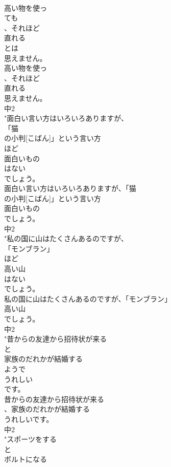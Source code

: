 \documentclass[8pt]{extreport}
\begin{document}
\begin{CJK}{UTF8}{min}
\\	高い物を使っ
\\	ても
\\	、それほど
\\	直れる
\\	とは
\\	思えません。
\\	高い物を使っ
\\	、それほど
\\	直れる
\\	思えません。
\\	中2
\\	"面白い言い方はいろいろありますが、
\\	「猫
\\	の小判[こばん]」という言い方
\\	ほど
\\	面白いもの
\\	はない
\\	でしょう。
\\	面白い言い方はいろいろありますが、「猫
\\	の小判[こばん]」という言い方
\\	面白いもの
\\	でしょう。
\\	中2
\\	"私の国に山はたくさんあるのですが、
\\	「モンブラン」
\\	ほど
\\	高い山
\\	はない
\\	でしょう。
\\	私の国に山はたくさんあるのですが、「モンブラン」
\\	高い山
\\	でしょう。
\\	中2
\\	"昔からの友達から招待状が来る
\\	と
\\	家族のだれかが結婚する
\\	ようで
\\	うれしい
\\	です。
\\	昔からの友達から招待状が来る
\\	、家族のだれかが結婚する
\\	うれしいです。
\\	中2
\\	"スポーツをする
\\	と
\\	ボルトになる

\end{CJK}
\end{document}
